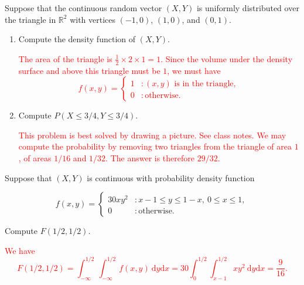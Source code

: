\documentclass[12pt,reqno]{amsart}
\begin{document}
\prob Suppose that the continuous random vector $(X,Y)$ is uniformly distributed over the triangle in $\mathbb{R}^2$ with vertices $(-1,0)$, $(1,0)$, and $(0,1)$.

\medskip
\begin{enumerate}
\item Compute the density function of $(X,Y)$.
    
\bigskip
\textcolor{red}{The area of the triangle is $\frac{1}{2} \times 2 \times 1 = 1$. Since the volume under the density surface and above this triangle must be $1$, we must have
	\[
	f(x,y) = \begin{cases}
	1 & : (x,y) \text{ is in the triangle}, \\
	0 & : \text{otherwise}.
	\end{cases}
	\]}
\bigskip

\item Compute $P(X \leq 3/4, Y \leq 3/4)$.
    
\bigskip
\textcolor{red}{This problem is best solved by drawing a picture. See class notes. We may compute the probability by removing two triangles from the triangle of area $1$, of areas $1/16$ and $1/32$. The answer is therefore $29/32$.}
\bigskip
\end{enumerate}


















\prob Suppose that $(X,Y)$ is continuous with probability density function

	\[
	f(x,y) = \begin{cases}
	30xy^2 & : x-1 \leq y \leq 1-x, \ 0 \leq x \leq 1, \\
	0 & : \text{otherwise}.
	\end{cases}
	\]

Compute $F(1/2,1/2)$.

\bigskip
\textcolor{red}{We have
	\[
	F(1/2,1/2) = \int_{-\infty}^{1/2} \int_{-\infty}^{1/2} f(x,y) \ \text{d}y \text{d}x = 30\int_{0}^{1/2} \int_{x-1}^{1/2} xy^2 \ \text{d}y\text{d}x = \frac{9}{16}.
	\]}
\bigskip
\end{document}
